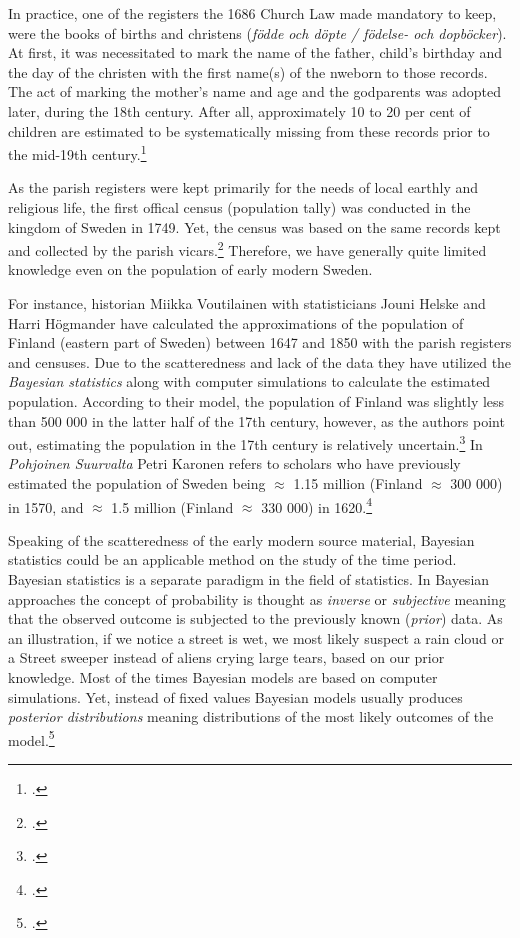 In practice, one of the registers the 1686 Church Law made mandatory to keep, were the books of births and christens (\textit{födde och döpte / födelse- och dopböcker}). At first, it was necessitated to mark the name of the father, child's birthday and the day of the christen with the first name(s) of the nweborn to those records. The act of marking the mother's name and age and the godparents was adopted later, during the 18th century. After all, approximately 10 to 20 per cent of children are estimated to be systematically missing from these records prior to the mid-19th century.\footcite{eilola21}

As the parish registers were kept primarily for the needs of local earthly and religious life, the first offical census (population tally) was conducted in the kingdom of Sweden in 1749. Yet, the census was based on the same records kept and collected by the parish vicars.\footcite{eilola21b} Therefore, we have generally quite limited knowledge even on the population of early modern Sweden. 

For instance, historian Miikka Voutilainen with statisticians Jouni Helske and Harri Högmander have calculated the approximations of the population of Finland (eastern part of Sweden) between 1647 and 1850 with the parish registers and censuses. Due to the scatteredness and lack of the data they have utilized the \textit{Bayesian statistics} along with computer simulations to calculate the estimated population. According to their model, the population of Finland was slightly less than 500 000 in the latter half of the 17th century, however, as the authors point out, estimating the population in the 17th century is relatively uncertain.\footcite{voutilainenEtAl} In \textit{Pohjoinen Suurvalta} Petri Karonen refers to scholars who have previously estimated the population of Sweden being $\approx$ 1.15 million (Finland $\approx$ 300 000) in 1570, and $\approx$ 1.5 million (Finland $\approx$ 330 000) in 1620.\footcite[pp. 33-34.]{pSuurvalta}

Speaking of the scatteredness of the early modern source material, Bayesian statistics could be an applicable method on the study of the time period. Bayesian statistics is a separate paradigm in the field of statistics. In Bayesian approaches the concept of probability is thought as \textit{inverse} or \textit{subjective} meaning that the observed outcome is subjected to the previously known (\textit{prior}) data. As an illustration, if we notice a street is wet, we most likely suspect a rain cloud or a Street sweeper instead of aliens crying large tears, based on our prior knowledge. Most of the times Bayesian models are based on computer simulations. Yet, instead of fixed values Bayesian models usually produces \textit{posterior distributions} meaning distributions of the most likely outcomes of the model.\footcites[pp. 16-25.]{kruschke2015}[For an example of posterior distribution see e. g. ][Fig. 3.]{voutilainenEtAl}

